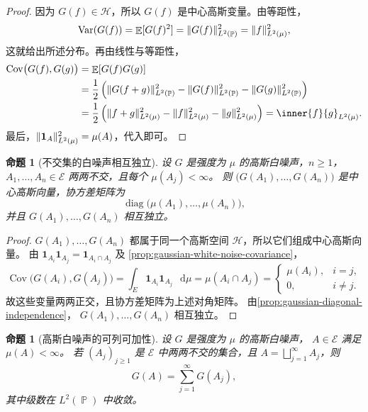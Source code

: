\documentclass[UTF8,11pt,a4paper,oneside,fontset=fandol]{ctexrep}
\numberwithin{equation}{section}
\theoremstyle{plain}
\newtheorem{proposition}[theorem]{命题}
\theoremstyle{definition}
\theoremstyle{remark}
\newcommand{\Hcal}{\mathcal{H}}
\DeclareMathOperator{\Prob}{\mathbb{P}}
\DeclareMathOperator{\E}{\mathbb{E}}
\DeclareMathOperator{\Var}{Var}
\DeclareMathOperator{\Cov}{Cov}
\newcommand{\ind}[1]{\mathbf{1}_{#1}}
\newcommand{\dd}{\mathop{}\!\mathrm{d}}
\DeclarePairedDelimiter{\norm}{\lVert}{\rVert}
\begin{document}
\begin{proof}
因为 $G(f)\in\Hcal$，所以 $G(f)$ 是中心高斯变量。由等距性，
\[
  \Var(G(f))=\E[G(f)^2]
  =\norm{G(f)}_{L^2(\Prob)}^2
  =\norm{f}_{L^2(\mu)}^2,
\]
这就给出所述分布。再由线性与等距性，
\begin{align*}
  \Cov\bigl(G(f),G(g)\bigr)
  &=\E[G(f)G(g)]\\
  &=\frac12\left(
      \norm{G(f+g)}_{L^2(\Prob)}^2
      -\norm{G(f)}_{L^2(\Prob)}^2
      -\norm{G(g)}_{L^2(\Prob)}^2\right)\\
  &=\frac12\left(
      \norm{f+g}_{L^2(\mu)}^2
      -\norm{f}_{L^2(\mu)}^2
      -\norm{g}_{L^2(\mu)}^2\right)
   =\inner{f}{g}_{L^2(\mu)}.
\end{align*}
最后，$\norm{\ind{A}}_{L^2(\mu)}^2=\mu(A)$，代入即可。
\end{proof}

\begin{proposition}[不交集的白噪声相互独立]
\label{prop:gaussian-white-noise-disjoint-independence}
设 $G$ 是强度为 $\mu$ 的高斯白噪声，$n\ge1$，
$A_1,\ldots,A_n\in\mathcal{E}$ 两两不交，且每个 $\mu(A_j)<\infty$。
则 $\bigl(G(A_1),\ldots,G(A_n)\bigr)$ 是中心高斯向量，协方差矩阵为
\[
  \operatorname{diag}\bigl(\mu(A_1),\ldots,\mu(A_n)\bigr),
\]
并且 $G(A_1),\ldots,G(A_n)$ 相互独立。
\end{proposition}

\begin{proof}
$G(A_1),\ldots,G(A_n)$ 都属于同一个高斯空间 $\Hcal$，所以它们组成中心高斯向量。
由 $\ind{A_i}\ind{A_j}=\ind{A_i\cap A_j}$ 及
\cref{prop:gaussian-white-noise-covariance}，
\[
  \Cov\bigl(G(A_i),G(A_j)\bigr)
  =\int_E\ind{A_i}\ind{A_j}\,\dd\mu
  =\mu(A_i\cap A_j)
  =\begin{cases}
     \mu(A_i),&i=j,\\
     0,&i\ne j.
   \end{cases}
\]
故这些变量两两正交，且协方差矩阵为上述对角矩阵。
由\cref{prop:gaussian-diagonal-independence}，
$G(A_1),\ldots,G(A_n)$ 相互独立。
\end{proof}

\begin{proposition}[高斯白噪声的可列可加性]
\label{prop:gaussian-white-noise-countable-additivity}
设 $G$ 是强度为 $\mu$ 的高斯白噪声，
$A\in\mathcal{E}$ 满足 $\mu(A)<\infty$。
若 $(A_j)_{j\ge1}$ 是 $\mathcal{E}$ 中两两不交的集合，且
$A=\bigsqcup_{j=1}^{\infty}A_j$，则
\[
  G(A)=\sum_{j=1}^{\infty}G(A_j),
\]
其中级数在 $L^2(\Prob)$ 中收敛。
\end{proposition}
\end{document}

